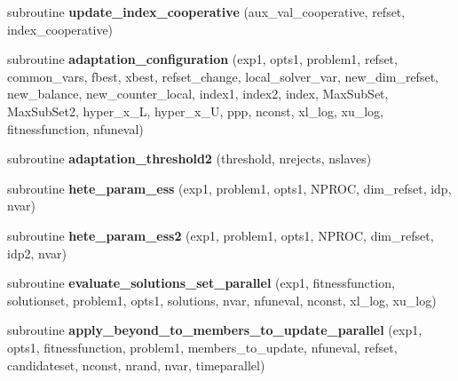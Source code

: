 \begin{DoxyCompactItemize}
\item 
\hypertarget{classparallelscattersearchfunctions_a0c34640f60f87541bdb1dd43487eb66a}{subroutine {\bfseries update\-\_\-index\-\_\-cooperative} (aux\-\_\-val\-\_\-cooperative, refset, index\-\_\-cooperative)}\label{classparallelscattersearchfunctions_a0c34640f60f87541bdb1dd43487eb66a}

\item 
\hypertarget{classparallelscattersearchfunctions_a5f192fa11f95f5836ec77218ecd1be71}{subroutine {\bfseries adaptation\-\_\-configuration} (exp1, opts1, problem1, refset, common\-\_\-vars, fbest, xbest, refset\-\_\-change, local\-\_\-solver\-\_\-var, new\-\_\-dim\-\_\-refset, new\-\_\-balance, new\-\_\-counter\-\_\-local, index1, index2, index, Max\-Sub\-Set, Max\-Sub\-Set2, hyper\-\_\-x\-\_\-\-L, hyper\-\_\-x\-\_\-\-U, ppp, nconst, xl\-\_\-log, xu\-\_\-log, fitnessfunction, nfuneval)}\label{classparallelscattersearchfunctions_a5f192fa11f95f5836ec77218ecd1be71}

\item 
\hypertarget{classparallelscattersearchfunctions_a72fc82afc81b559566ca1b3cad5d8bd0}{subroutine {\bfseries adaptation\-\_\-threshold2} (threshold, nrejects, nslaves)}\label{classparallelscattersearchfunctions_a72fc82afc81b559566ca1b3cad5d8bd0}

\item 
\hypertarget{classparallelscattersearchfunctions_a1e1d5c5ad73598334354ae0b7fa60eae}{subroutine {\bfseries hete\-\_\-param\-\_\-ess} (exp1, problem1, opts1, N\-P\-R\-O\-C, dim\-\_\-refset, idp, nvar)}\label{classparallelscattersearchfunctions_a1e1d5c5ad73598334354ae0b7fa60eae}

\item 
\hypertarget{classparallelscattersearchfunctions_aa6fe85dad4caa90b905378b424fd7319}{subroutine {\bfseries hete\-\_\-param\-\_\-ess2} (exp1, problem1, opts1, N\-P\-R\-O\-C, dim\-\_\-refset, idp2, nvar)}\label{classparallelscattersearchfunctions_aa6fe85dad4caa90b905378b424fd7319}

\item 
\hypertarget{classparallelscattersearchfunctions_a7dcdb488ef4a584a708f8154944c1abe}{subroutine {\bfseries evaluate\-\_\-solutions\-\_\-set\-\_\-parallel} (exp1, fitnessfunction, solutionset, problem1, opts1, solutions, nvar, nfuneval, nconst, xl\-\_\-log, xu\-\_\-log)}\label{classparallelscattersearchfunctions_a7dcdb488ef4a584a708f8154944c1abe}

\item 
\hypertarget{classparallelscattersearchfunctions_a0ca733cc11595a0896825637c3e65b02}{subroutine {\bfseries apply\-\_\-beyond\-\_\-to\-\_\-members\-\_\-to\-\_\-update\-\_\-parallel} (exp1, opts1, fitnessfunction, problem1, members\-\_\-to\-\_\-update, nfuneval, refset, candidateset, nconst, nrand, nvar, timeparallel)}\label{classparallelscattersearchfunctions_a0ca733cc11595a0896825637c3e65b02}


\end{DoxyCompactItemize}
